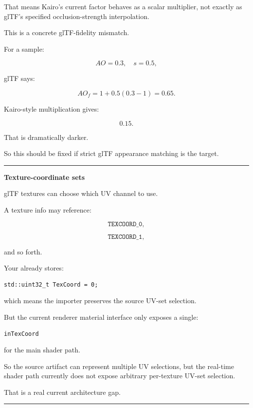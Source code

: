 That means Kairo's current  factor behaves as a scalar multiplier, not exactly as glTF's specified occlusion-strength interpolation.

This is a concrete glTF-fidelity mismatch.

For a sample:

\[
AO=0.3,
\quad
s=0.5,
\]

glTF says:

\[
AO_f=
1+0.5(0.3-1)
=
0.65.
\]

Kairo-style multiplication gives:

\[
0.15.
\]

That is dramatically darker.

So this should be fixed if strict glTF appearance matching is the target.

\begin{center}\rule{0.5\linewidth}{0.5pt}\end{center}

\textbf{Texture-coordinate sets}

glTF textures can choose which UV channel to use.

A texture info may reference:

\[
\texttt{TEXCOORD\_0},
\]

\[
\texttt{TEXCOORD\_1},
\]

and so forth.

Your  already stores:

\begin{verbatim}
std::uint32_t TexCoord = 0;
\end{verbatim}

which means the importer preserves the source UV-set selection.

But the current renderer material interface only exposes a single:

\begin{verbatim}
inTexCoord
\end{verbatim}

for the main shader path.

So the source artifact can represent multiple UV selections, but the real-time shader path currently does not expose arbitrary per-texture UV-set selection.

That is a real current architecture gap.

\begin{center}\rule{0.5\linewidth}{0.5pt}\end{center}

